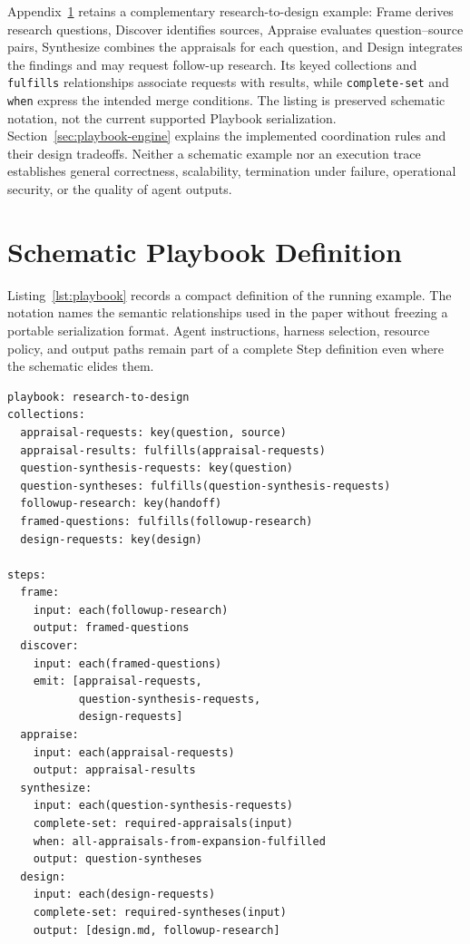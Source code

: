 \documentclass[letterpaper]{article}
\theoremstyle{definition}
\begin{document}
Appendix~\ref{app:playbook-definition} retains a complementary
research-to-design example: Frame derives research questions, Discover
identifies sources, Appraise evaluates question--source pairs, Synthesize
combines the appraisals for each question, and Design integrates the findings
and may request follow-up research. Its keyed collections and
\texttt{fulfills} relationships associate requests with results, while
\texttt{complete-set} and \texttt{when} express the intended merge conditions.
The listing is preserved schematic notation, not the current supported
Playbook serialization. Section~\ref{sec:playbook-engine} explains the
implemented coordination rules and their design tradeoffs. Neither a schematic example nor an
execution trace establishes general correctness, scalability, termination
under failure, operational security, or the quality of agent outputs.


{\small

}

\clearpage
\appendix
\section{Schematic Playbook Definition}
\label{app:playbook-definition}

Listing~\ref{lst:playbook} records a compact definition of the running example.
The notation names the semantic relationships used in the paper without
freezing a portable serialization format. Agent instructions, harness
selection, resource policy, and output paths remain part of a complete Step
definition even where the schematic elides them.

\begin{listing}[H]
\begin{lstlisting}
playbook: research-to-design
collections:
  appraisal-requests: key(question, source)
  appraisal-results: fulfills(appraisal-requests)
  question-synthesis-requests: key(question)
  question-syntheses: fulfills(question-synthesis-requests)
  followup-research: key(handoff)
  framed-questions: fulfills(followup-research)
  design-requests: key(design)

steps:
  frame:
    input: each(followup-research)
    output: framed-questions
  discover:
    input: each(framed-questions)
    emit: [appraisal-requests,
           question-synthesis-requests,
           design-requests]
  appraise:
    input: each(appraisal-requests)
    output: appraisal-results
  synthesize:
    input: each(question-synthesis-requests)
    complete-set: required-appraisals(input)
    when: all-appraisals-from-expansion-fulfilled
    output: question-syntheses
  design:
    input: each(design-requests)
    complete-set: required-syntheses(input)
    output: [design.md, followup-research]
\end{lstlisting}
\caption{Schematic research-to-design Playbook. An initial agenda is represented
as the first member of \texttt{followup-research}; later Design executions may
emit another member or an explicitly empty collection.}
\label{lst:playbook}
\end{listing}
\end{document}
